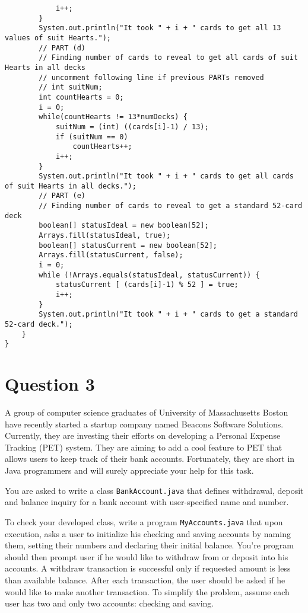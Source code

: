 \begin{enumerate}
\begin{lstlisting}
			i++;
		}
		System.out.println("It took " + i + " cards to get all 13 values of suit Hearts.");
		// PART (d)
		// Finding number of cards to reveal to get all cards of suit Hearts in all decks
		// uncomment following line if previous PARTs removed
		// int suitNum;
		int countHearts = 0;
		i = 0;
		while(countHearts != 13*numDecks) {
			suitNum = (int) ((cards[i]-1) / 13);
			if (suitNum == 0)
				countHearts++;
			i++;
		}
		System.out.println("It took " + i + " cards to get all cards of suit Hearts in all decks.");
		// PART (e)
		// Finding number of cards to reveal to get a standard 52-card deck
		boolean[] statusIdeal = new boolean[52];
		Arrays.fill(statusIdeal, true);
		boolean[] statusCurrent = new boolean[52];
		Arrays.fill(statusCurrent, false);
		i = 0;
		while (!Arrays.equals(statusIdeal, statusCurrent)) {
			statusCurrent [ (cards[i]-1) % 52 ] = true;
			i++;
		}
		System.out.println("It took " + i + " cards to get a standard 52-card deck.");
	}
}
\end{lstlisting}
\end{enumerate}

\section*{Question 3}
A group of computer science graduates of University of Massachusetts Boston have recently started a startup company named Beacons Software Solutions.
Currently, they are investing their efforts on developing a Personal Expense Tracking (PET) system.
They are aiming to add a cool feature to PET that allows users to keep track of their bank accounts.
Fortunately, they are short in Java programmers and will surely appreciate your help for this task.

You are asked to write a class \texttt{BankAccount.java} that defines withdrawal, deposit and balance inquiry for a bank account with user-specified name and number.

To check your developed class, write a program \texttt{MyAccounts.java} that upon execution, asks a user to initialize his checking and saving accounts by naming them, setting their numbers and declaring their initial balance.
You're program should then prompt user if he would like to withdraw from or deposit into his accounts.
A withdraw transaction is successful only if requested amount is less than available balance.
After each transaction, the user should be asked if he would like to make another transaction.
To simplify the problem, assume each user has two and only two accounts: checking and saving.

